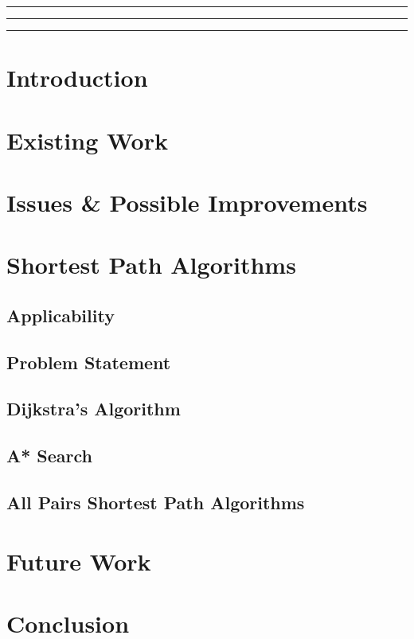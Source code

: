 \documentclass[a4paper,12pt]{article}
\begin{document}

\tableofcontents
\vspace{0.5cm}
\hrule \hrule \hrule
\newpage

\section{Introduction}

\section{Existing Work}

\section{Issues \& Possible Improvements}

\section{Shortest Path Algorithms}

\subsection{Applicability}

\subsection{Problem Statement}

\subsection{Dijkstra's Algorithm}

\subsection{A* Search}

\subsection{All Pairs Shortest Path Algorithms}

\section{Future Work}

\section{Conclusion}

\nocite{cormen}
\nocite{coursera}
\nocite{ieee_mdp}



\end{document}
